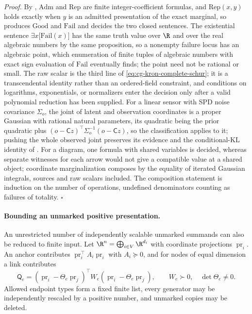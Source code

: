 \noindent\emph{Proof.}
By , \(\mathrm{Adm}\) and \(\mathrm{Rep}\) are
finite integer-coefficient formulas, and \(\mathrm{Rep}(x,y)\) holds exactly when
\(y\) is an admitted presentation of the exact marginal, so
 produces \(\mathrm{Good}\) and
\(\mathrm{Fail}\) and decides the two closed sentences. The existential sentence
\(\exists x\bigl[\mathrm{Fail}(x)\bigr]\) has the same truth value over \(\R\) and over the
real algebraic numbers by the same proposition, so a nonempty failure locus has
an algebraic point, which enumeration of finite tuples of algebraic numbers with
exact sign evaluation of \(\mathrm{Fail}\) eventually finds; the point need not
be rational or small. The raw scalar is the third line of
\eqref{eq:cg-kron-complete-schur}; it is a transcendental identity rather than an
ordered-field constraint, and conditions on logarithms, exponentials, or
normalizers enter the decision only after a valid polynomial reduction has been
supplied. For a linear sensor with SPD noise covariance \(\Sigma_o\), the joint
of latent and observation coordinates is a proper Gaussian with rational natural
parameters, its quadratic being the prior quadratic plus
\((o-\mathsf Cz)^\top\Sigma_o^{-1}(o-\mathsf Cz)\), so the classification applies to
it; pushing the whole observed joint preserves its evidence and the
conditional-KL identity of . For a diagram, one formula
with shared variables is decided, whereas separate witnesses for each arrow
would not give a compatible value at a shared object; coordinate
marginalization composes by the equality of iterated Gaussian integrals, sources
and raw scalars included. The composition statement is induction on the number
of operations, undefined denominators counting as failures of totality.
\(\square\)

\paragraph{Bounding an unmarked positive presentation.}
An unrestricted number of independently scalable unmarked summands can also be
reduced to finite input. Let \(\R^n=\bigoplus_{i\in V}\R^{d_i}\) with coordinate
projections \(\operatorname{pr}_i\). An anchor contributes
\(\operatorname{pr}_i^\top A_i\operatorname{pr}_i\) with \(A_i\succeq0\), and for
nodes of equal dimension a link contributes
\begin{equation}
\mathsf Q_e=(\operatorname{pr}_i-\Theta_e\operatorname{pr}_j)^\top W_e(\operatorname{pr}_i-\Theta_e\operatorname{pr}_j),
\qquad W_e\succ0,\quad\det\Theta_e\neq0.
\label{eq:cg-finite-pair-generator}
\end{equation}
Allowed endpoint types form a fixed finite list, every generator may be
independently rescaled by a positive number, and unmarked copies may be deleted.

